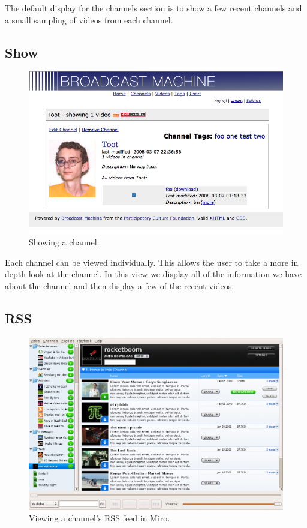 \documentclass[a4paper,12pt]{report}
\begin{document}
The default display for the channels section is to show a few recent channels and a small sampling of videos from each channel.

\subsection{Show}
\begin{figure}[h]
\begin{center}
\includegraphics[width=150mm]{./images/channelshow.png}
\end{center}
\caption{Showing a channel.}
\end{figure}

Each channel can be viewed individually.
This allows the user to take a more in depth look at the channel.
In this view we display all of the information we have about the channel and then display a few of the recent videos.

\subsection{RSS}
\begin{figure}[h]
\begin{center}
\includegraphics[width=150mm]{./images/channelrss.png}
\end{center}
\caption{Viewing a channel's RSS feed in Miro.}
\end{figure}
\end{document}

